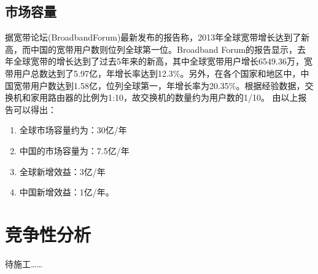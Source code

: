 \documentclass[12pt,a4paper]{report}
\begin{document}
\section{市场容量}
据宽带论坛(BroadbandForum)最新发布的报告称，2013年全球宽带增长达到了新高，而中国的宽带用户数则位列全球第一位。Broadband Forum的报告显示，去年全球宽带的增长达到了过去5年来的新高，其中全球宽带用户增长6549.36万，宽带用户总数达到了5.97亿，年增长率达到12.3\%。另外，在各个国家和地区中，中国宽带用户数达到1.58亿，位列全球第一，年增长率为20.35\%。根据经验数据，交换机和家用路由器的比例为1:10，故交换机的数量约为用户数的1/10。
由以上报告可以得出：
\begin{enumerate}
    \item 全球市场容量约为：30亿/年
    \item 中国的市场容量为：7.5亿/年
    \item 全球新增效益：3亿/年
    \item 中国新增效益：1亿/年。
\end{enumerate}

\chapter{竞争性分析}
待施工……
\end{document}
